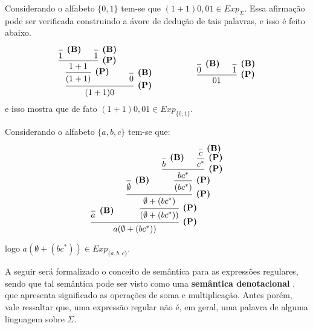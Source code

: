 \begin{exemplo}
	Considerando o alfabeto $\{0,1\}$ tem-se que $(1 + 1)0, 01 \in Exp_\Sigma$. Essa afirmação pode ser verificada construindo a ávore de dedução de tais palavras, e isso é feito abaixo.

	\[
	\begin{prooftree}
		\hypo{ }
		\infer1[\textbf{(B)}]{ 1 }
		\hypo{ }
		\infer1[\textbf{(B)}]{ 1 }
		\infer2[\textbf{(P)}]{ 1 + 1 }
		\infer1[\textbf{(P)}]{ (1 + 1) }
		\hypo{ }
		\infer1[\textbf{(B)}]{ 0 }
		\infer2[\textbf{(P)}]{ (1 + 1)0 }
	\end{prooftree}
	\quad 
	\ \ \ \ \ \ \ \ \ \
	\quad 
	\begin{prooftree}
		\hypo{ }
		\infer1[\textbf{(B)}]{ 0 }
		\hypo{ }
		\infer1[\textbf{(B)}]{ 1 }
		\infer2[\textbf{(P)}]{ 01 }
	\end{prooftree}
	\]
	e isso mostra que de fato $(1 + 1)0, 01 \in Exp_{\{0,1\}}$.
\end{exemplo}

\begin{exemplo}
	Considerando o alfabeto $\{a, b, c\}$ tem-se que:

	\[
		\begin{prooftree}
			\hypo{ }
			\infer1[\textbf{(B)}]{ a }
			\hypo{ }
			\infer1[\textbf{(B)}]{ \emptyset }
			\hypo{ }
			\infer1[\textbf{(B)}]{ b }
			\hypo{ }
			\infer1[\textbf{(B)}]{ c }
			\infer1[\textbf{(P)}]{ c^* }
			\infer2[\textbf{(P)}]{ bc^* }
			\infer1[\textbf{(P)}]{ (bc^*) }
			\infer2[\textbf{(P)}]{ \emptyset + (bc^*) }
			\infer1[\textbf{(P)}]{ (\emptyset + (bc^*)) }
			\infer2[\textbf{(P)}]{ a(\emptyset + (bc^*)) }
		\end{prooftree}
	\]

	logo $a(\emptyset + (bc^*)) \in Exp_{\{a, b, c\}}$.
\end{exemplo}

A seguir será formalizado o conceito de semântica para as expressões regulares, sendo que tal semântica pode ser visto como uma \textbf{semântica denotacional} \cite{scott1971}, que apresenta significado as operações de soma e multiplicação. Antes porém, vale ressaltar que, uma expressão regular não é, em geral, uma palavra de alguma linguagem sobre $\Sigma$.

\ 

